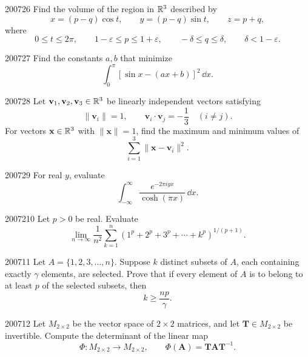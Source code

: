 \begin{problem}{2007}{2}{6}
Find the volume of the region in $\mathbb{R}^3$ described by
\[
    x=(p-q)\cos t,
    \qquad
    y=(p-q)\sin t,
    \qquad
    z=p+q,
\]
where
\[
    0\le t\le2\pi,
    \qquad
    1-\varepsilon\le p\le1+\varepsilon,
    \qquad
    -\delta\le q\le\delta,
    \qquad
    \delta<1-\varepsilon.
\]
\end{problem}

\begin{problem}{2007}{2}{7}
Find the constants $a, b$ that minimize
\[
    \int_0^{\pi}[\sin x-(ax+b)]^2\, \dd x.
\]
\end{problem}

\begin{problem}{2007}{2}{8}
Let $\mathbf v_1, \mathbf v_2, \mathbf v_3\in\mathbb{R}^3$ be linearly independent vectors satisfying
\[
    \|\mathbf v_i\|=1,
    \qquad
    \mathbf v_i\cdot\mathbf v_j=-\frac13
    \quad(i\ne j).
\]
For vectors $\mathbf x\in\mathbb{R}^3$ with $\|\mathbf x\|=1$, find the maximum and minimum values of
\[
    \sum_{i=1}^3\|\mathbf x-\mathbf v_i\|^2.
\]
\end{problem}

\begin{problem}{2007}{2}{9}
For real $y$, evaluate
\[
    \int_{-\infty}^{\infty}\frac{e^{-2\pi i yx}}{\cosh(\pi x)}\, \dd x.
\]
\end{problem}

\begin{problem}{2007}{2}{10}
Let $p>0$ be real. Evaluate
\[
    \lim_{n\to\infty}
    \frac1{n^2}
    \sum_{k=1}^{n}
    \left(1^p+2^p+3^p+\cdots+k^p\right)^{1/(p+1)}.
\]
\end{problem}

\begin{problem}{2007}{1}{1}
Let $A=\{1, 2, 3, \dots, n\}$. Suppose $k$ distinct subsets of $A$, each containing exactly $\gamma$ elements, are selected. Prove that if every element of $A$ is to belong to at least $p$ of the selected subsets, then
\[
    k\ge\frac{np}{\gamma}.
\]
\end{problem}

\begin{problem}{2007}{1}{2}
Let $M_{2\times2}$ be the vector space of $2\times2$ matrices, and let $\mathbf T\in M_{2\times2}$ be invertible. Compute the determinant of the linear map
\[
    \Phi\colon M_{2\times2}\to M_{2\times2},
    \qquad
    \Phi(\mathbf A)=\mathbf T\mathbf A\mathbf T^{-1}.
\]
\end{problem}

